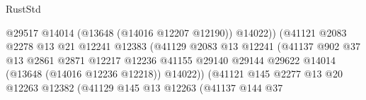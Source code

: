 \begin{lexlean}{RustStd}
\begin{coremodule}
                                                    @29517
                                                    @14014
                                                    (@13648 (@14016 @12207 @12190))
                                                    @14022))
                                                (@41121
                                                  @2083
                                                  @2278
                                                  @13
                                                  @21
                                                  @12241
                                                  @12383
                                                  (@41129
                                                    @2083
                                                    @13
                                                    @12241
                                                    (@41137
                                                      @902
                                                      @37
                                                      @13
                                                      @2861
                                                      @2871
                                                      @12217
                                                      @12236
                                                      @41155
                                                      @29140
                                                      @29144
                                                      @29622
                                                      @14014
                                                      (@13648 (@14016 @12236 @12218))
                                                      @14022))
                                                  (@41121
                                                    @145
                                                    @2277
                                                    @13
                                                    @20
                                                    @12263
                                                    @12382
                                                    (@41129
                                                      @145
                                                      @13
                                                      @12263
                                                      (@41137
                                                        @144
                                                        @37

\end{coremodule}
\end{lexlean}
